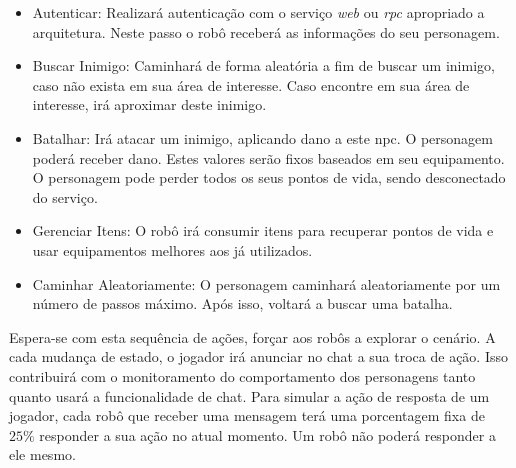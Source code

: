 \begin{itemize}
  \item Autenticar: Realizará autenticação com o serviço \textit{web} ou \textit{rpc} apropriado a arquitetura. Neste passo o robô receberá as informações do seu personagem.
  \item Buscar Inimigo: Caminhará de forma aleatória a fim de buscar um inimigo, caso não exista em sua área de interesse. Caso encontre em sua área de interesse, irá aproximar deste inimigo.
  \item Batalhar: Irá atacar um inimigo, aplicando dano a este \ac{npc}. O personagem poderá receber dano. Estes valores serão fixos baseados em seu equipamento. O personagem pode perder todos os seus pontos de vida, sendo desconectado do serviço.
  \item Gerenciar Itens: O robô irá consumir itens para recuperar pontos de vida e usar equipamentos melhores aos já utilizados.
  \item Caminhar Aleatoriamente: O personagem caminhará aleatoriamente por um número de passos máximo. Após isso, voltará a buscar uma batalha.
\end{itemize}

Espera-se com esta sequência de ações, forçar aos robôs a explorar o cenário.
%
A cada mudança de estado, o jogador irá anunciar no chat a sua troca de ação.
%
Isso contribuirá com o monitoramento do comportamento dos personagens tanto quanto usará a funcionalidade de chat.
%
Para simular a ação de resposta de um jogador, cada robô que receber uma mensagem terá uma porcentagem fixa de $25\%$ responder a sua ação no atual momento.
%
Um robô não poderá responder a ele mesmo.

%
